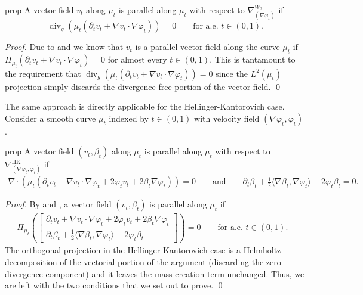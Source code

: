 \documentclass[11pt]{article}
\newcommand{\HK}{\operatorname{HK}}
\begin{document}
\begin{restatable}{prop}{} \label{Wasserstein parallel transport pde}
    A vector field $v_t$ along $\mu_t$ is parallel along $\mu_t$ with respect to $\nabla_{(\nabla\varphi_t)}^{W_2}$ if
    \begin{equation*}
        \operatorname{div}_g \left(\mu_t\left(\partial_t v_t + \nabla v_t \cdot \nabla \varphi_t\right)\right) = 0 \qquad \text{for a.e. $t \in (0,1).$}
    \end{equation*}
\end{restatable}
\noindent \textit{Proof.} Due to  and  we know that $v_t$ is a parallel vector field along the curve $\mu_t$ if $\Pi_{\mu_t}\left(\partial_tv_t + \nabla v_t \cdot \nabla\varphi_t\right) = 0$ for almost every $t \in (0,1).$ This is tantamount to the requirement that $\operatorname{div}_g\left(\mu_t(\partial_tv_t + \nabla v_t \cdot \nabla\varphi_t)\right) = 0$ since the $L^2(\mu_t)$ projection simply discards the divergence free portion of the vector field. \qed{}

The same approach is directly applicable for the Hellinger-Kantorovich case. Consider a smooth curve $\mu_t$ indexed by $t \in (0,1)$ with velocity field $(\nabla\varphi_t, \varphi_t)$. 

\begin{restatable}{prop}{} \label{HK parallel transport pde}
    A vector field $(v_t, \beta_t)$ along $\mu_t$ is parallel along $\mu_t$ with respect to $\nabla_{(\nabla\varphi_t, \varphi_t)}^{\HK}$ if
    \begin{align*}
        \nabla \cdot (\mu_t (\partial_tv_t + \nabla v_t \cdot \nabla \varphi_t + 2\varphi_t v_t + 2\beta_t \nabla\varphi_t)) = 0 
        \qquad \text{and} \qquad 
        \partial_t\beta_t + \frac{1}{2}\langle\nabla \beta_t, \nabla\varphi_t\rangle + 2\varphi_t \beta_t = 0.
    \end{align*}
\end{restatable}
\noindent \textit{Proof.} By  and , a vector field $(v_t, \beta_t)$ is parallel along $\mu_t$ if
\begin{align}
    \Pi_{\mu_t}\left(\begin{bmatrix}
        \partial_tv_t + \nabla v_t\cdot \nabla\varphi_t + 2\varphi_tv_t +  2\beta_t\nabla\varphi_t \\
        \partial_t\beta_t + \frac{1}{2}\langle\nabla \beta_t, \nabla\varphi_t\rangle + 2\varphi_t \beta_t
    \end{bmatrix}\right) = 0 \qquad \text{for a.e. $t \in (0,1).$ }
\end{align}
The orthogonal projection in the Hellinger-Kantorovich case is a Helmholtz decomposition of the vectorial portion of the argument (discarding the zero divergence component) and it leaves the mass creation term unchanged. Thus, we are left with the two conditions that we set out to prove. \qed{}
\end{document}
